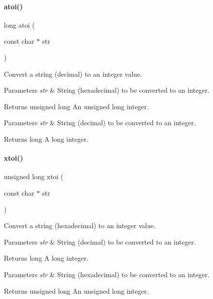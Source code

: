 \paragraph{\texorpdfstring{atoi()}{atoi()}}
{\footnotesize\ttfamily long atoi (\begin{DoxyParamCaption}\item[{const char $\ast$}]{str }\end{DoxyParamCaption})}



Convert a string (decimal) to an integer value. 


\begin{DoxyParams}{Parameters}
{\em str} & String (hexadecimal) to be converted to an integer. \\
\hline
\end{DoxyParams}
\begin{DoxyReturn}{Returns}
unsigned long An unsigned long integer.
\end{DoxyReturn}

\begin{DoxyParams}{Parameters}
{\em str} & String (decimal) to be converted to an integer. \\
\hline
\end{DoxyParams}
\begin{DoxyReturn}{Returns}
long A long integer. 
\end{DoxyReturn}
\mbox{\label{a00062_a9d6165da864d16ad50c13690c1e7d7ea}} 
\paragraph{\texorpdfstring{xtoi()}{xtoi()}}
{\footnotesize\ttfamily unsigned long xtoi (\begin{DoxyParamCaption}\item[{const char $\ast$}]{str }\end{DoxyParamCaption})}



Convert a string (hexadecimal) to an integer value. 


\begin{DoxyParams}{Parameters}
{\em str} & String (decimal) to be converted to an integer. \\
\hline
\end{DoxyParams}
\begin{DoxyReturn}{Returns}
long A long integer.
\end{DoxyReturn}

\begin{DoxyParams}{Parameters}
{\em str} & String (hexadecimal) to be converted to an integer. \\
\hline
\end{DoxyParams}
\begin{DoxyReturn}{Returns}
unsigned long An unsigned long integer. 
\end{DoxyReturn}
